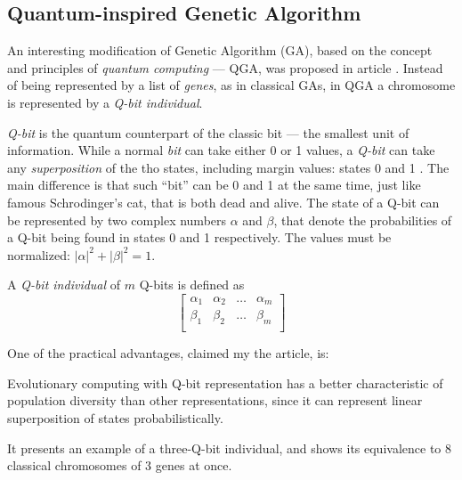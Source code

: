 \documentclass[../header]{subfiles}
\begin{document}
\providecommand{\rootdir}{..}



\subsection{Quantum-inspired Genetic Algorithm}
An interesting modification of Genetic Algorithm (GA), based on the concept and
principles of \emph{quantum computing} --- QGA, was proposed in article
\cite{QuantumGeneticAlgorithm}.
Instead of being represented by a list of \emph{genes}, as in classical GAs,
in QGA a chromosome is represented by a \emph{Q-bit individual}.

\emph{Q-bit} is the quantum counterpart of the classic bit --- the smallest
unit of information. While a normal \emph{bit} can take either 0 or 1 values,
a \emph{Q-bit} can take any \emph{superposition} of the tho states, including
margin values: states 0 and 1 \cite{QuantumGeneticAlgorithm}.
The main difference is that such ``bit'' can be
0 and 1 at the same time, just like famous Schrodinger's cat, that is both dead
and alive. The state of a Q-bit can be represented by two complex numbers
$\alpha$ and $\beta$, that denote the probabilities of a Q-bit being found in
states 0 and 1 respectively.
The values must be normalized: $|\alpha|^2 + |\beta|^2 = 1$.

A \emph{Q-bit individual} of $m$ Q-bits is defined as
\begin{equation}
\left[
  \begin{array}{cccc}
  \alpha_1 & \alpha_2 & \dots & \alpha_m \\
  \beta_1  & \beta_2  & \dots & \beta_m  \\
  \end{array}
\right]
\end{equation}

One of the practical advantages, claimed my the article, is:
\begin{displayquote}
  Evolutionary computing with Q­-bit representation has a better characteristic
  of population diversity than other representations, since it can represent
  linear superposition of states probabilistically.
\end{displayquote}
It presents an example of a three-Q-bit individual, and shows its equivalence
to 8 classical chromosomes of 3 genes at once.
\end{document}
